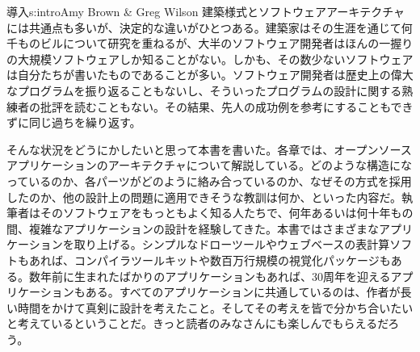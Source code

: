 \begin{aosachapter}{導入}{s:intro}{Amy Brown \& Greg Wilson}
建築様式とソフトウェアアーキテクチャには共通点も多いが、決定的な違いがひとつある。建築家はその生涯を通じて何千ものビルについて研究を重ねるが、大半のソフトウェア開発者はほんの一握りの大規模ソフトウェアしか知ることがない。しかも、その数少ないソフトウェアは自分たちが書いたものであることが多い。ソフトウェア開発者は歴史上の偉大なプログラムを振り返ることもないし、そういったプログラムの設計に関する熟練者の批評を読むこともない。その結果、先人の成功例を参考にすることもできずに同じ過ちを繰り返す。

そんな状況をどうにかしたいと思って本書を書いた。各章では、オープンソースアプリケーションのアーキテクチャについて解説している。どのような構造になっているのか、各パーツがどのように絡み合っているのか、なぜその方式を採用したのか、他の設計上の問題に適用できそうな教訓は何か、といった内容だ。執筆者はそのソフトウェアをもっともよく知る人たちで、何年あるいは何十年もの間、複雑なアプリケーションの設計を経験してきた。本書ではさまざまなアプリケーションを取り上げる。シンプルなドローツールやウェブベースの表計算ソフトもあれば、コンパイラツールキットや数百万行規模の視覚化パッケージもある。数年前に生まれたばかりのアプリケーションもあれば、30周年を迎えるアプリケーションもある。すべてのアプリケーションに共通しているのは、作者が長い時間をかけて真剣に設計を考えたこと。そしてその考えを皆で分かち合いたいと考えているということだ。きっと読者のみなさんにも楽しんでもらえるだろう。


\end{aosachapter}
